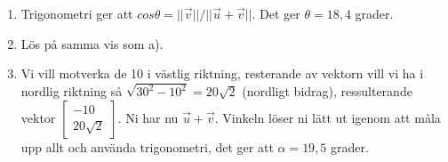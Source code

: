 \begin{enumerate}
\item Trigonometri ger att $cos \theta = || \vec{v} || / || \vec{u} + \vec{v} || $. Det ger $\theta = 18,4$ grader. 
\item Lös på samma vis som a). 
\item Vi vill motverka de 10 i västlig riktning, resterande av vektorn vill vi ha i nordlig riktning så $\sqrt{30^{2}-10^{2}} = 20\sqrt{2}$ (nordligt bidrag), ressulterande vektor $\begin{bmatrix} -10 \\ 20\sqrt{2} \end{bmatrix}$. Ni har nu $\vec{u} + \vec{v}$. Vinkeln löser ni lätt ut igenom att måla upp allt och använda trigonometri, det ger att $\alpha = 19,5$ grader. 
\end{enumerate}